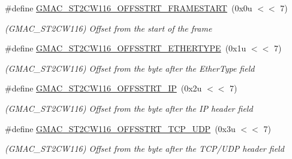 \begin{DoxyCompactItemize}
\item 
\mbox{\label{group__SAME70__GMAC_gabab3f0e132f3900e58dbf99b9d7d0b5a}} 
\#define \mbox{\hyperlink{group__SAME70__GMAC_gabab3f0e132f3900e58dbf99b9d7d0b5a}{G\+M\+A\+C\+\_\+\+S\+T2\+C\+W116\+\_\+\+O\+F\+F\+S\+S\+T\+R\+T\+\_\+\+F\+R\+A\+M\+E\+S\+T\+A\+RT}}~(0x0u $<$$<$ 7)
\begin{DoxyCompactList}\small\item\em (G\+M\+A\+C\+\_\+\+S\+T2\+C\+W116) Offset from the start of the frame \end{DoxyCompactList}\item 
\mbox{\label{group__SAME70__GMAC_ga07c3a8505787ab64e7fdfc072d67164d}} 
\#define \mbox{\hyperlink{group__SAME70__GMAC_ga07c3a8505787ab64e7fdfc072d67164d}{G\+M\+A\+C\+\_\+\+S\+T2\+C\+W116\+\_\+\+O\+F\+F\+S\+S\+T\+R\+T\+\_\+\+E\+T\+H\+E\+R\+T\+Y\+PE}}~(0x1u $<$$<$ 7)
\begin{DoxyCompactList}\small\item\em (G\+M\+A\+C\+\_\+\+S\+T2\+C\+W116) Offset from the byte after the Ether\+Type field \end{DoxyCompactList}\item 
\mbox{\label{group__SAME70__GMAC_ga33125f0251c6cc5e3bc26ef42db01072}} 
\#define \mbox{\hyperlink{group__SAME70__GMAC_ga33125f0251c6cc5e3bc26ef42db01072}{G\+M\+A\+C\+\_\+\+S\+T2\+C\+W116\+\_\+\+O\+F\+F\+S\+S\+T\+R\+T\+\_\+\+IP}}~(0x2u $<$$<$ 7)
\begin{DoxyCompactList}\small\item\em (G\+M\+A\+C\+\_\+\+S\+T2\+C\+W116) Offset from the byte after the IP header field \end{DoxyCompactList}\item 
\mbox{\label{group__SAME70__GMAC_ga0245ebf84f81ff1255ed6a1c0917950f}} 
\#define \mbox{\hyperlink{group__SAME70__GMAC_ga0245ebf84f81ff1255ed6a1c0917950f}{G\+M\+A\+C\+\_\+\+S\+T2\+C\+W116\+\_\+\+O\+F\+F\+S\+S\+T\+R\+T\+\_\+\+T\+C\+P\+\_\+\+U\+DP}}~(0x3u $<$$<$ 7)
\begin{DoxyCompactList}\small\item\em (G\+M\+A\+C\+\_\+\+S\+T2\+C\+W116) Offset from the byte after the T\+C\+P/\+U\+DP header field \end{DoxyCompactList}\item 
\mbox{\label{group__SAME70__GMAC_ga10719b7caa03b4d8f0dc9a3e4761f84b}} 

\end{DoxyCompactItemize}
